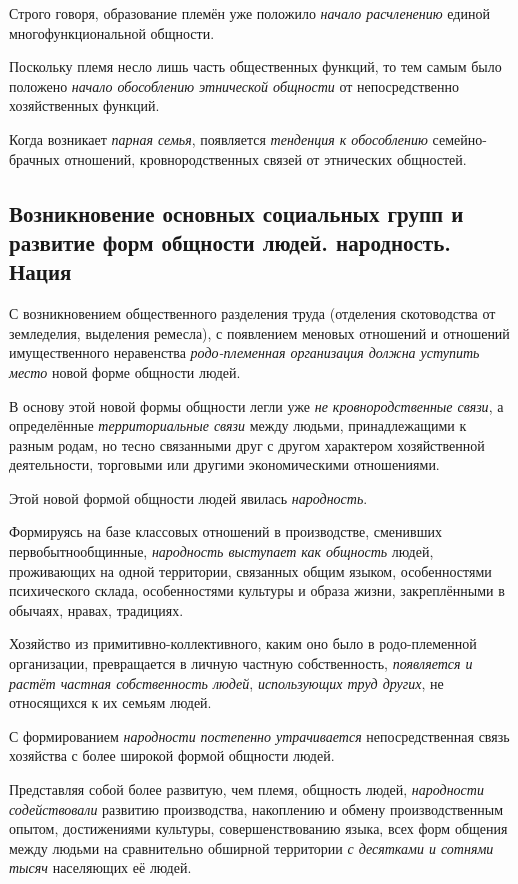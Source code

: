 \documentclass[a4paper,14pt,russian]{extreport}
\begin{document}
Строго говоря, образование племён уже положило \emph{начало расчленению} единой многофункциональной общности.

Поскольку племя несло лишь часть общественных функций, то тем самым было положено \emph{начало обособлению этнической общности} от непосредственно хозяйственных функций.

Когда возникает \emph{парная семья}, появляется \emph{тенденция к обособлению} семейно-брачных отношений, кровнородственных связей от этнических общностей.

\subsection{Возникновение основных социальных групп и развитие форм общности людей. народность. Нация}

С возникновением общественного разделения труда (отделения скотоводства от земледелия, выделения ремесла), с появлением меновых отношений и отношений имущественного неравенства \emph{родо-племенная организация должна уступить место} новой форме общности людей.

В основу этой новой формы общности легли уже \emph{не кровнородственные связи}, а определённые \emph{территориальные связи} между людьми, принадлежащими к разным родам, но тесно связанными друг с другом характером хозяйственной деятельности, торговыми или другими экономическими отношениями.

Этой новой формой общности людей явилась \emph{народность}.

Формируясь на базе классовых отношений в производстве, сменивших первобытнообщинные, \emph{народность выступает как общность} людей, проживающих на одной территории, связанных общим языком, особенностями психического склада, особенностями культуры и образа жизни, закреплёнными в обычаях, нравах, традициях.

Хозяйство из примитивно-коллективного, каким оно было в родо-племенной организации, превращается в личную частную собственность, \emph{появляется и растёт частная собственность людей}, \emph{использующих труд других}, не относящихся к их семьям людей.

С формированием \emph{народности} \emph{постепенно утрачивается} непосредственная связь хозяйства с более широкой формой общности людей.

Представляя собой более развитую, чем племя, общность людей, \emph{народности содействовали} развитию производства, накоплению и обмену производственным опытом, достижениями культуры, совершенствованию языка, всех форм общения между людьми на сравнительно обширной территории \emph{с десятками и сотнями тысяч} населяющих её людей.
\end{document}
